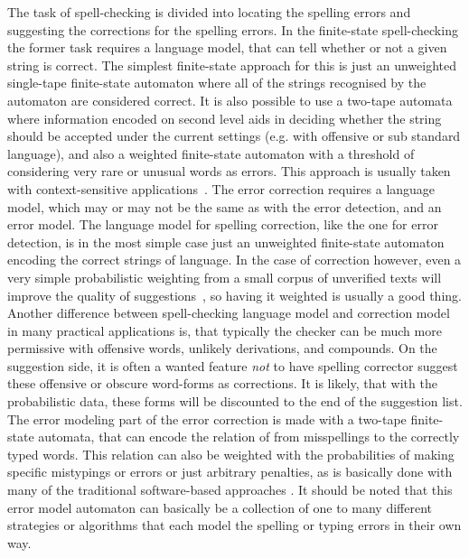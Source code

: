 \documentclass[a4paper,12pt]{article}
\begin{document}
The task of spell-checking is divided into locating the spelling errors and
suggesting the corrections for the spelling errors. In the finite-state
spell-checking the former task requires a language model, that can tell whether
or not a given string is correct. The simplest finite-state approach for this
is just an unweighted single-tape finite-state automaton where all of the
strings recognised by the automaton are considered correct. It is also possible
to use a two-tape automata where information encoded on second level aids in
deciding whether the string should be accepted under the current settings (e.g.
with offensive or sub standard language), and also a weighted finite-state
automaton with a threshold of considering very rare or unusual words as errors.
This approach is usually taken with context-sensitive
applications~\cite[]{otero/2007}. The error correction requires a language
model, which may or may not be the same as with the error detection, and an
error model.  The language model for spelling correction, like the one for
error detection, is in the most simple case just an unweighted finite-state
automaton encoding the correct strings of language. In the case of correction
however, even a very simple probabilistic weighting from a small corpus of
unverified texts will improve the quality of
suggestions~\cite[]{pirinen/2010/lrec}, so having it weighted is usually a good
thing. Another difference between spell-checking language model and correction
model in many practical applications is, that typically the checker can be much
more permissive with offensive words, unlikely derivations, and compounds. On
the suggestion side, it is often a wanted feature \emph{not} to have spelling
corrector suggest these offensive or obscure word-forms as corrections. It is
likely, that with the probabilistic data, these forms will be discounted to the
end of the suggestion list. The error modeling part of the error correction is
made with a two-tape finite-state automata, that can encode the relation of
from misspellings to the correctly typed words. This relation can also be
weighted with the probabilities of making specific mistypings or errors or just
arbitrary penalties, as is basically done with many of the traditional
software-based approaches \cite[such as][]{hunspell/manual}. It should be noted
that this error model automaton can basically be a collection of one to many
different strategies or algorithms that each model the spelling or typing
errors in their own way.
\end{document}
